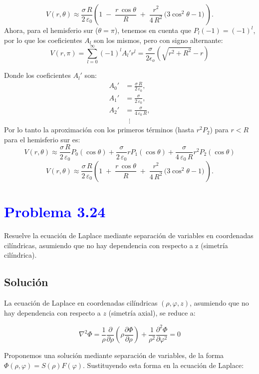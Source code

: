 \documentclass[12pt]{article}
\newcommand{\question}[1]{\textcolor{blue}{\textbf{#1}}}
\begin{document}
\[
V(r,\theta)\approx
\frac{\sigma\,R}{2\,\varepsilon_{0}}\left (1
\;-\;
\frac{r\,\cos\theta}{R}
\;+\;
\frac{r^{2}}{4\,R^2}\,\bigl(3\cos^{2}\theta - 1\bigr)\,\right).
\]
Ahora, para el hemisferio sur (\(\theta=\pi\)), tenemos en cuenta que \(P_{l}(-1) = (-1)^{l}\), por lo que los coeficientes \(A_{l}\) son los mismos, pero con signo alternante: 
\[ V(r,\pi) = \sum_{l=0}^{\infty} (-1)^l A_l'r^l = \frac{\sigma}{2 \epsilon_o} \left( \sqrt{r^2 + R^2} -r\right)\]

Donde los coeficientes \(A_l'\) son:
\[
\begin{aligned}
A_{0}' &= \frac{\sigma\,R}{2\,\varepsilon_{0}}, \\[6pt]
A_{1}' &= \frac{\sigma}{2\,\varepsilon_{0}}, \\[6pt]
A_{2}' &= \frac{\sigma}{4\,\varepsilon_{0}\,R}, \\[6pt]
&\;\;\vdots
\end{aligned}
\]
Por lo tanto la aproximación con los primeros términos (hasta \(r^{2}P_{2}\)) para \(r<R\) para el hemisferio sur es:
\[
V(r,\theta) \approx \frac{\sigma\,R}{2\,\varepsilon_{0}} P_{0}(\cos\theta) + \frac{\sigma}{2\,\varepsilon_{0}} r P_{1}(\cos\theta) + \frac{\sigma}{4\,\varepsilon_{0}\,R} r^{2} P_{2}(\cos\theta)\]
\[
V(r,\theta)\approx
\frac{\sigma\,R}{2\,\varepsilon_{0}}\left (1
\;+\;
\frac{r\,\cos\theta}{R}
\;+\;
\frac{r^{2}}{4\,R^2}\,\bigl(3\cos^{2}\theta - 1\bigr)\,\right).
\]
\section*{\question{Problema 3.24}}
Resuelve la ecuación de Laplace mediante separación de variables en coordenadas cilíndricas, asumiendo que no hay dependencia con respecto a z (simetría cilíndrica).

\subsection*{Solución}

La ecuación de Laplace en coordenadas cilíndricas $(\rho, \varphi, z)$, asumiendo que no hay dependencia con respecto a $z$ (simetría axial), se reduce a:

$$ \nabla^2 \Phi = \frac{1}{\rho} \frac{\partial}{\partial \rho} \left( \rho \frac{\partial \Phi}{\partial \rho} \right) + \frac{1}{\rho^2} \frac{\partial^2 \Phi}{\partial \varphi^2} = 0 $$

Proponemos una solución mediante separación de variables, de la forma $\Phi(\rho, \varphi) = S(\rho) F(\varphi)$. Sustituyendo esta forma en la ecuación de Laplace:
\end{document}
